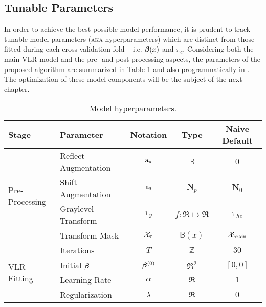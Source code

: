 \subsection{Tunable Parameters}
In order to achieve the best possible model performance, it is prudent to track tunable model parameters (\textsc{aka} hyperparameters) which are distinct from those fitted during each cross validation fold -- i.e. $\bm{\beta}(x)$ and $\pi_c$.
Considering both the main VLR model and the pre- and post-processing aspects, the parameters of the proposed algorithm are summarized in Table \ref{tab:hyperparams} and also programmatically in .
The optimization of these model components will be the subject of the next chapter.
\begin{table}
  \centering
  \caption{Model hyperparameters.}
  \label{tab:hyperparams}
  \begin{tabular}{llccc}
  	\hline
  	Stage                            & Parameter            &         Notation          &            Type            &       Naive Default       \\ \hline
  	\multirow{4}{*}{Pre-Processing}  & Reflect Augmentation & $\mathrm{a}_{\textsc{r}}$ &        $\mathbb{B}$        &            $0$            \\
  	                                 & Shift Augmentation   & $\mathrm{a}_{\textsc{s}}$ &       $\mathbf{N}_p$       &      $\mathbf{N}_0$       \\
  	                                 & Graylevel Transform  &        $\uptau_y$         &     $f: \Re\mapsto\Re$     &       $\uptau_{he}$       \\
  	                                 & Transform Mask       &       $\mathcal{X}_{\uptau}$       &      $\mathbb{B}(x)$       &    $\mathcal{X}_{\text{brain}}$    \\ \hline
  	\multirow{6}{*}{VLR Fitting}     & Iterations           &            $T$            &        $\mathbb{Z}$        &           $30$            \\
  	                                 & Initial $\bm{\beta}$        &        $\bm{\beta}^{(0)}$        &          $\Re^2$           &          $[0,0]$          \\
  	                                 & Learning Rate        &         $\alpha$          &           $\Re$            &            $1$            \\
  	                                 & Regularization       &         $\lambda$         &           $\Re$            &            $0$            \\

\end{tabular}
\end{table}

